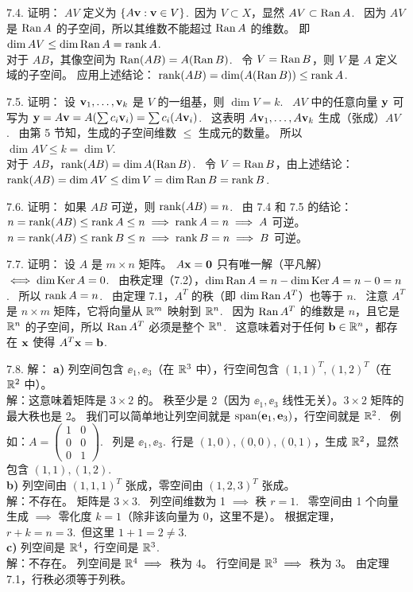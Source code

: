 \begin{exer}
7.4. 证明：
$AV$ 定义为 $\{ A\mathbf{v} : \mathbf{v} \in V \}$.~因为 $V \subset X$，显然 $AV \subset \operatorname{Ran} A$.~
因为 $AV$ 是 $\operatorname{Ran} A$ 的子空间，所以其维数不能超过 $\operatorname{Ran} A$ 的维数。
即 $\dim AV \le \dim \operatorname{Ran} A = \operatorname{rank} A$.~
\\
对于 $AB$，其像空间为 $\operatorname{Ran}(AB) = A(\operatorname{Ran} B)$.~
令 $V = \operatorname{Ran} B$，则 $V$ 是 $A$ 定义域的子空间。
应用上述结论：
$\operatorname{rank}(AB) = \dim(A(\operatorname{Ran} B)) \le \operatorname{rank} A$.~

7.5. 证明：
设 $\mathbf{v}_1, \dots, \mathbf{v}_k$ 是 $V$ 的一组基，则 $\dim V = k$.~
$AV$ 中的任意向量 $\mathbf{y}$ 可写为 $\mathbf{y} = A\mathbf{v} = A(\sum c_i \mathbf{v}_i) = \sum c_i (A\mathbf{v}_i)$.~
这表明 $A\mathbf{v}_1, \dots, A\mathbf{v}_k$ 生成（张成）$AV$.~
由第 5 节知，生成的子空间维数 $\le$ 生成元的数量。
所以 $\dim AV \le k = \dim V$.~
\\
对于 $AB$，$\operatorname{rank}(AB) = \dim A(\operatorname{Ran} B)$.~
令 $V = \operatorname{Ran} B$，由上述结论：
$\operatorname{rank}(AB) = \dim AV \le \dim V = \dim \operatorname{Ran} B = \operatorname{rank} B$.~

7.6. 证明：
如果 $AB$ 可逆，则 $\operatorname{rank}(AB) = n$.~
由 7.4 和 7.5 的结论：
$n = \operatorname{rank}(AB) \le \operatorname{rank} A \le n \implies \operatorname{rank} A = n \implies A$ 可逆。
$n = \operatorname{rank}(AB) \le \operatorname{rank} B \le n \implies \operatorname{rank} B = n \implies B$ 可逆。

7.7. 证明：
设 $A$ 是 $m \times n$ 矩阵。
$A \mathbf{x} = \mathbf{0}$ 只有唯一解（平凡解） $\iff \dim \operatorname{Ker} A = 0$.~
由秩定理（7.2），$\dim \operatorname{Ran} A = n - \dim \operatorname{Ker} A = n - 0 = n$.~
所以 $\operatorname{rank} A = n$.~
由定理 7.1，$A^T$ 的秩（即 $\dim \operatorname{Ran} A^T$）也等于 $n$.~
注意 $A^T$ 是 $n \times m$ 矩阵，它将向量从 $\mathbb{R}^m$ 映射到 $\mathbb{R}^n$.~
因为 $\operatorname{Ran} A^T$ 的维数是 $n$，且它是 $\mathbb{R}^n$ 的子空间，所以 $\operatorname{Ran} A^T$ 必须是整个 $\mathbb{R}^n$.~
这意味着对于任何 $\mathbf{b} \in \mathbb{R}^n$，都存在 $\mathbf{x}$ 使得 $A^T \mathbf{x} = \mathbf{b}$.~

7.8. 解： \textbf{a)} 列空间包含 $\ee_1, \ee_3$（在 $\mathbb{R}^3$ 中），行空间包含 $(1, 1)^T, (1, 2)^T$（在 $\mathbb{R}^2$ 中）。
\\
解：这意味着矩阵是 $3 \times 2$ 的。
秩至少是 2（因为 $\ee_1, \ee_3$ 线性无关）。$3 \times 2$ 矩阵的最大秩也是 2。
我们可以简单地让列空间就是 $\operatorname{span}(\mathbf{e}_1, \mathbf{e}_3)$，行空间就是 $\mathbb{R}^2$.~
例如：$A = \begin{pmatrix} 1 & 0 \\ 0 & 0 \\ 0 & 1 \end{pmatrix}$.~
列是 $\ee_1, \ee_3$.~行是 $(1,0), (0,0), (0,1)$，生成 $\mathbb{R}^2$，显然包含 $(1,1), (1,2)$.~
\\
\textbf{b)} 列空间由 $(1, 1, 1)^T$ 张成，零空间由 $(1, 2, 3)^T$ 张成。
\\
解：不存在。
矩阵是 $3 \times 3$.~
列空间维数为 1 $\implies$ 秩 $r = 1$.~
零空间由 1 个向量生成 $\implies$ 零化度 $k = 1$（除非该向量为 0，这里不是）。
根据定理， $r + k = n = 3$.~但这里 $1 + 1 = 2 \neq 3$.~
\\
\textbf{c)} 列空间是 $\mathbb{R}^4$，行空间是 $\mathbb{R}^3$. ~
\\
解：不存在。
列空间是 $\mathbb{R}^4 \implies$ 秩为 4。
行空间是 $\mathbb{R}^3 \implies$ 秩为 3。
由定理 7.1，行秩必须等于列秩。


\end{exer}
